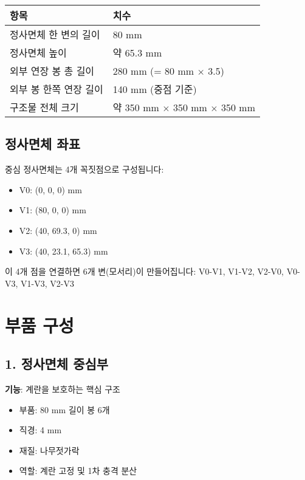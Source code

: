 \documentclass[a4paper,12pt]{article}
\begin{document}
\begin{CJK}{UTF8}{mj}
\begin{center}
\begin{tabular}{ll}
\toprule
\textbf{항목} & \textbf{치수} \\
\midrule
정사면체 한 변의 길이 & 80 mm \\
정사면체 높이 & 약 65.3 mm \\
외부 연장 봉 총 길이 & 280 mm (= 80 mm $\times$ 3.5) \\
외부 봉 한쪽 연장 길이 & 140 mm (중점 기준) \\
구조물 전체 크기 & 약 350 mm $\times$ 350 mm $\times$ 350 mm \\
\bottomrule
\end{tabular}
\end{center}

\subsection{정사면체 좌표}

중심 정사면체는 4개 꼭짓점으로 구성됩니다:

\begin{itemize}
    \item V0: (0, 0, 0) mm
    \item V1: (80, 0, 0) mm
    \item V2: (40, 69.3, 0) mm
    \item V3: (40, 23.1, 65.3) mm
\end{itemize}

이 4개 점을 연결하면 6개 변(모서리)이 만들어집니다:
V0-V1, V1-V2, V2-V0, V0-V3, V1-V3, V2-V3

\section{부품 구성}

\subsection{1. 정사면체 중심부}

\textbf{기능}: 계란을 보호하는 핵심 구조

\begin{itemize}
    \item 부품: 80 mm 길이 봉 6개
    \item 직경: 4 mm
    \item 재질: 나무젓가락
    \item 역할: 계란 고정 및 1차 충격 분산
\end{itemize}


\end{CJK}
\end{document}
